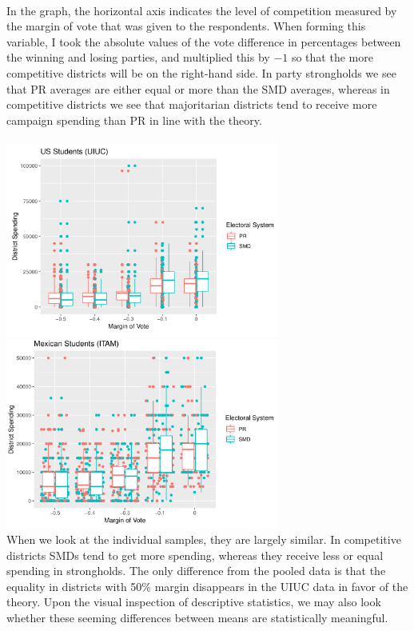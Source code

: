 \documentclass{article}
\begin{document}
\\
In the graph, the horizontal axis indicates the level of competition measured by the margin of vote that was given to the respondents. When forming this variable, I took the absolute values of the vote difference in percentages between the winning and losing parties, and multiplied this by $-1$ so that the more competitive districts will be on the right-hand side. In party strongholds we see that PR averages are either equal or more than the SMD averages, whereas in competitive districts we see that majoritarian districts tend to receive more campaign spending than PR in line with the theory.\\
\\
\includegraphics[width=90mm]{Boxplot_UIUC}
\includegraphics[width=90mm]{Boxplot_ITAM}\\
When we look at the individual samples, they are largely similar. In competitive districts SMDs tend to get more spending, whereas they receive less or equal spending in strongholds. The only difference from the pooled data is that the equality in districts with 50\% margin disappears in the UIUC data in favor of the theory. Upon the visual inspection of descriptive statistics, we may also look whether these seeming differences between means are statistically meaningful. \\
\end{document}

